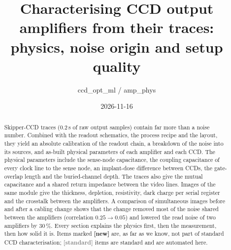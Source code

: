 \documentclass[11pt]{article}
\title{Characterising CCD output amplifiers from their traces:\\ physics, noise origin and setup quality}
\author{ccd\_opt\_ml / amp\_phys}
\date{2026-11-16}
\newcommand{\novel}{\textcolor{blue!60!black}{\textbf{[new]}}}
\newcommand{\std}{\textcolor{gray}{\textbf{[standard]}}}
\begin{document}
\maketitle

\begin{abstract}
Skipper-CCD traces (0.2\,s of raw output samples) contain far more than a noise number. Combined with the readout
schematics, the process recipe and the layout, they yield an absolute calibration of the readout chain, a breakdown of
the noise into its sources, and as-built physical parameters of each amplifier and each CCD. The physical parameters
include the sense-node capacitance, the coupling capacitance of every clock line to the sense node, an implant-dose
difference between CCDs, the gate-overlap length and the buried-channel depth. The traces also give the mutual
capacitance and a shared return impedance between the video lines. Images of the same module give the thickness,
depletion, resistivity, dark charge per serial register and the crosstalk between the amplifiers. A comparison of
simultaneous images before and after a cabling change shows that the change removed most of the noise shared between
the amplifiers (correlation $0.25\to0.05$) and lowered the read noise of two amplifiers by 30\,\%. Every section explains
the physics first, then the measurement, then how solid it is. Items marked \novel{} are, as far as we know, not part of
standard CCD characterisation; \std{} items are standard and are automated here.
\end{abstract}

\tableofcontents
\newpage

\end{document}
